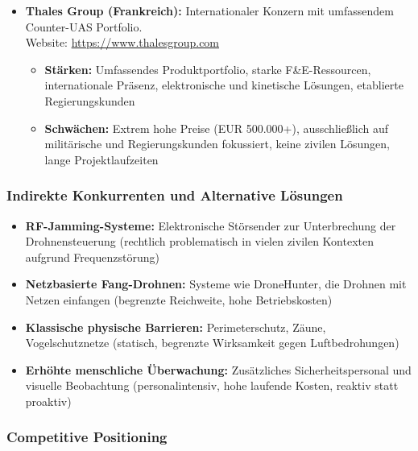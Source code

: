 \documentclass[11pt,a4paper]{article}
\begin{document}
\begin{itemize}
    \item \textbf{Thales Group (Frankreich):} Internationaler Konzern mit umfassendem Counter-UAS Portfolio. \\
    Website: \url{https://www.thalesgroup.com}
    \begin{itemize}
        \item \textbf{Stärken:} Umfassendes Produktportfolio, starke F\&E-Ressourcen, internationale Präsenz, 
        elektronische und kinetische Lösungen, etablierte Regierungskunden
        \item \textbf{Schwächen:} Extrem hohe Preise (EUR 500.000+), ausschließlich auf militärische und 
        Regierungskunden fokussiert, keine zivilen Lösungen, lange Projektlaufzeiten
    \end{itemize}
    
\end{itemize}

\subsubsection*{Indirekte Konkurrenten und Alternative Lösungen}
\begin{itemize}
    \item \textbf{RF-Jamming-Systeme:} Elektronische Störsender zur Unterbrechung der Drohnensteuerung 
    (rechtlich problematisch in vielen zivilen Kontexten aufgrund Frequenzstörung)
    \item \textbf{Netzbasierte Fang-Drohnen:} Systeme wie DroneHunter, die Drohnen mit Netzen einfangen 
    (begrenzte Reichweite, hohe Betriebskosten)
    \item \textbf{Klassische physische Barrieren:} Perimeterschutz, Zäune, Vogelschutznetze (statisch, 
    begrenzte Wirksamkeit gegen Luftbedrohungen)
    \item \textbf{Erhöhte menschliche Überwachung:} Zusätzliches Sicherheitspersonal und visuelle Beobachtung 
    (personalintensiv, hohe laufende Kosten, reaktiv statt proaktiv)
\end{itemize}

\subsubsection*{Competitive Positioning}
\end{document}
